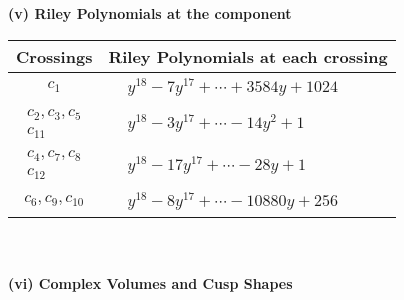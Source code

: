 \documentclass[1p]{elsarticle_modified}
\theoremstyle{definition}
\begin{document}
\newpage\renewcommand{\arraystretch}{1}
\flushleft \textbf{(v) Riley Polynomials at the component}\newline \\
\begin{tabular}{m{50pt}|m{274pt}}
Crossings & \hspace{64pt}Riley Polynomials at each crossing \\
\hline $$\begin{aligned}c_{1}\end{aligned}$$&$\begin{aligned}
&y^{18}-7 y^{17}+\cdots+3584 y+1024
\end{aligned}$\\
\hline $$\begin{aligned}c_{2},c_{3},c_{5}\\c_{11}\end{aligned}$$&$\begin{aligned}
&y^{18}-3 y^{17}+\cdots-14 y^2+1
\end{aligned}$\\
\hline $$\begin{aligned}c_{4},c_{7},c_{8}\\c_{12}\end{aligned}$$&$\begin{aligned}
&y^{18}-17 y^{17}+\cdots-28 y+1
\end{aligned}$\\
\hline $$\begin{aligned}c_{6},c_{9},c_{10}\end{aligned}$$&$\begin{aligned}
&y^{18}-8 y^{17}+\cdots-10880 y+256
\end{aligned}$\\
\hline
\end{tabular}\\~\\
\newpage\flushleft \textbf{(vi) Complex Volumes and Cusp Shapes}
\end{document}
